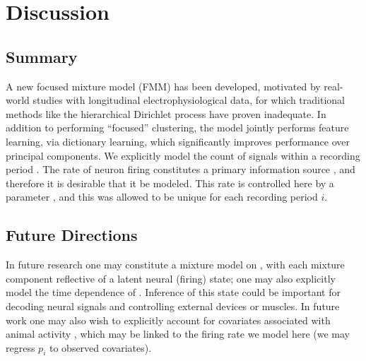 \documentclass[journal]{IEEEtran}
\begin{document}
\section{Discussion}\label{sec:conclusions}

\subsection{Summary} %
\label{sub:summary}

A new focused mixture model (FMM) has been developed, motivated by real-world studies with longitudinal electrophysiological data, for which traditional methods like the hierarchical Dirichlet process have proven inadequate. In addition to performing ``focused'' clustering, the model jointly performs feature learning, via dictionary learning, which significantly improves performance over principal components. We explicitly model the count of signals within a recording period . The rate of neuron firing constitutes a primary information source \cite{Donoghue07}, and therefore it is desirable that it be modeled. This rate is controlled here by a parameter , and this was allowed to be unique for each recording period $i$. 


\subsection{Future Directions} %
\label{sub:future_directions}

In future research one may constitute a mixture model on , with each mixture component reflective of a latent neural (firing) state; one may also explicitly model the time dependence of  \cite{Calabrese2010}. Inference of this state could be important for decoding neural signals and controlling external devices or muscles. In future work one may also wish to explicitly account for covariates associated with animal activity \cite{Ventura}, which may be linked to the firing rate we model here (we may regress $p_i$ to observed covariates).
\end{document}
